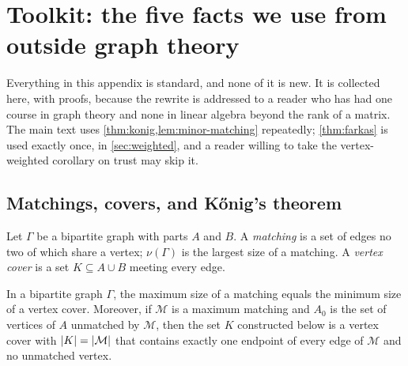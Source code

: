 \appendix
\section{Toolkit: the five facts we use from outside graph theory}\label{app:toolkit}

Everything in this appendix is standard, and none of it is new. It is collected here, with proofs,
because the rewrite is addressed to a reader who has had one course in graph theory and none in
linear algebra beyond the rank of a matrix. The main text uses \cref{thm:konig,lem:minor-matching}
repeatedly; \cref{thm:farkas} is used exactly once, in \cref{sec:weighted}, and a reader willing to
take the vertex-weighted corollary on trust may skip it.

\subsection{Matchings, covers, and K\H{o}nig's theorem}\label{app:konig}

Let $\Gamma$ be a bipartite graph with parts $A$ and $B$. A \emph{matching} is a set of edges no two
of which share a vertex; $\nu(\Gamma)$ is the largest size of a matching. A \emph{vertex cover} is a
set $K\subseteq A\cup B$ meeting every edge.

\begin{theorem}[K\H{o}nig]\label{thm:konig}
In a bipartite graph $\Gamma$, the maximum size of a matching equals the minimum size of a vertex
cover. Moreover, if $\mathcal M$ is a maximum matching and $A_0$ is the set of vertices of $A$
unmatched by $\mathcal M$, then the set $K$ constructed below is a vertex cover with
$\lvert K\rvert=\lvert \mathcal M\rvert$ that contains exactly one endpoint of every edge of $\mathcal M$ and no
unmatched vertex.
\end{theorem}


